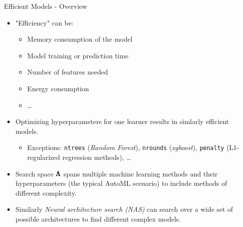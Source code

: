 \begin{frame}{Efficient Models - Overview}

\begin{itemize}
  \item "Efficiency" can be:
  \begin{itemize}
    \item Memory consumption of the model
    \item Model training or prediction time
    \item Number of features needed
    \item Energy consumption
    \item \ldots
  \end{itemize}
  \item Optimizing hyperparameters for one learner results in simlarly efficient models.
  \begin{itemize}
    \item Exceptions: \texttt{ntrees} (\emph{Random Forest}), \texttt{nrounds} (\emph{xgboost}), \texttt{penalty} (L1-regularized regression methods), \ldots
  \end{itemize}
  \item Search space $\pmb{\Lambda}$ spans multiple machine learning methods and their hyperparameters (the typical AutoML scenario) to include methods of different complexity.
  \item Similarly \emph{Neural architecture search (NAS)} can search over a wide set of possible architectures to find different complex models.
\end{itemize}

\end{frame}

